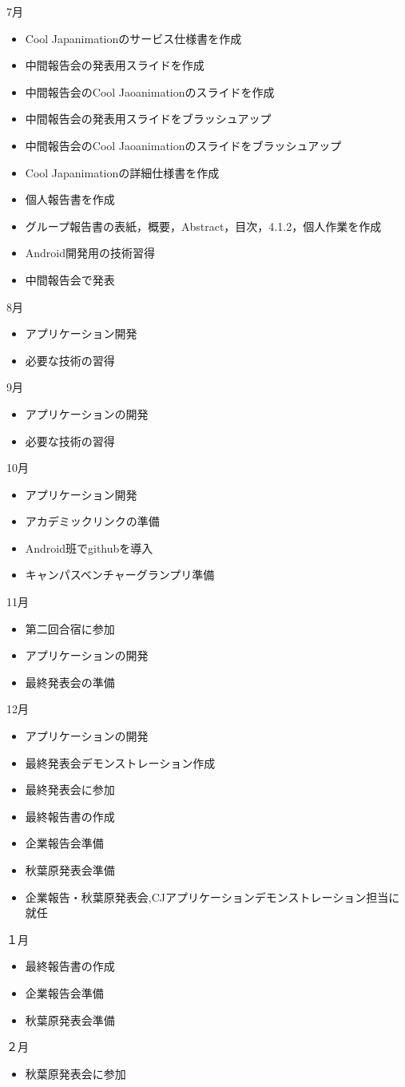 7月
\begin{itemize}
\item Cool Japanimationのサービス仕様書を作成
\item 中間報告会の発表用スライドを作成
\item 中間報告会のCool Jaoanimationのスライドを作成
\item 中間報告会の発表用スライドをブラッシュアップ
\item 中間報告会のCool Jaoanimationのスライドをブラッシュアップ
\item Cool Japanimationの詳細仕様書を作成
\item 個人報告書を作成
\item グループ報告書の表紙，概要，Abstract，目次，4.1.2，個人作業を作成
\item Android開発用の技術習得
\item 中間報告会で発表
\end{itemize}
8月
\begin{itemize}
\item アプリケーション開発
\item 必要な技術の習得
\end{itemize}
9月
\begin{itemize}
\item アプリケーションの開発
\item 必要な技術の習得
\end{itemize}
10月
\begin{itemize}
\item アプリケーション開発
\item アカデミックリンクの準備
\item Android班でgithubを導入
\item キャンパスベンチャーグランプリ準備
\end{itemize}
11月
\begin{itemize}
\item 第二回合宿に参加
\item アプリケーションの開発
\item 最終発表会の準備
\end{itemize}
12月
\begin{itemize}
\item アプリケーションの開発
\item 最終発表会デモンストレーション作成
\item 最終発表会に参加
\item 最終報告書の作成
\item 企業報告会準備
\item 秋葉原発表会準備
\item 企業報告・秋葉原発表会,CJアプリケーションデモンストレーション担当に就任

\end{itemize}
１月
\begin{itemize}
\item 最終報告書の作成
\item 企業報告会準備
\item 秋葉原発表会準備
\end{itemize}
２月
\begin{itemize}
\item 秋葉原発表会に参加
\end{itemize}

